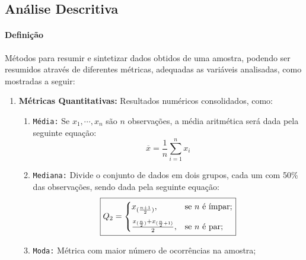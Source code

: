 \documentclass{article}
\begin{document}
        \subsection{Análise Descritiva}
            \paragraph{Definição}Métodos para resumir e sintetizar dados obtidos de uma amostra, podendo ser resumidos através de diferentes métricas, adequadas as variáveis analisadas, como mostradas a seguir:
                \begin{enumerate}[noitemsep]
                    \item \textbf{Métricas Quantitativas:} Resultados numéricos consolidados, como:
                        \begin{enumerate}[noitemsep]
                            \item \texttt{Média:} Se $x_{1}, \cdots, x_{n}$ são $n$ observações, a média aritmética será dada pela seguinte equação:
                                \begin{equation}
                                    \boxed{
                                        \overline{x} = \frac{1}{n} \sum_{i = 1}^{n} x_{i}
                                    }
                                \end{equation}
                        \item \texttt{Mediana:} Divide o conjunto de dados em dois grupos, cada um com 50\% das observações, sendo dada pela seguinte equação:
                                \begin{equation}
                                    \boxed{
                                        Q_{2} =
                                        \begin{cases}
                                            x_{(\frac{n+1}{2})},  & \text{se $n$ é ímpar};\vspace{2.5mm}\\
                                            \frac{x_{(\frac{n}{2})} + x_{(\frac{n}{2} + 1)}}{2},  & \text{se $n$ é par};\\
                                        \end{cases}
                                    }
                                \end{equation}
                            \item \texttt{Moda:} Métrica com maior número de ocorrências na amostra;

\end{enumerate}
\end{enumerate}
\end{document}
